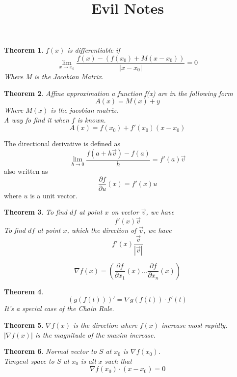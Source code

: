 \documentclass[letter]{article}
\title{Evil Notes}
\date{}
\newtheorem{theorem}{Theorem}[section]
\newenvironment{definition}[1][Definition]{\begin{trivlist}
\item[\hskip \labelsep {\bfseries #1}]}{\end{trivlist}}
\begin{document}
\maketitle
\vspace{-.5in}

\begin{theorem}
$f(x)$ is differentiable if
\[
\lim_{x\to x_0} \frac{f(x) - (f(x_0) + M(x-x_0))}{|x-x_0|} = 0
\]
Where M is the Jocabian Matrix.
\end{theorem}

\begin{theorem}
Affine approximation a function f(x) are in the following form
\[
A(x) = M(x) + y
\]
Where $M(x)$ is the jacobian matrix.\\
A way fo find it when $f$ is known.
\[ A(x) = f(x_0) + f'(x_0)(x-x_0) \]
\end{theorem}

\begin{definition}
The directional derivative is defined as
\[
\lim_{h\to 0} \frac{f(a+h\vec v) - f(a)}{h} = f'(a)\vec v
\]
also written as
\[
\frac{\partial f}{\partial u}(x) = f'(x) u
\]
where $u$ is a unit vector.\\
\end{definition}

\begin{theorem}
To find $df$ at point $x$ on vector $\vec v$, we have
\[
f'(x) \vec v
\]
To find $df$ at point $x$, which the direction of $\vec v$, we have 
\[
f'(x) \frac{\vec v}{|\vec v|}
\]
\end{theorem}
\begin{definition}[The gradient]
\[
\nabla f(x) = (\frac{\partial f}{\partial x_1}(x) \ldots \frac{\partial f}{\partial x_n}(x))
\]
\end{definition}
\begin{theorem}
\[
(g(f(t)))' = \nabla g(f(t)) \cdot f'(t)
\]
It's a special case of the Chain Rule.
\end{theorem}
\begin{theorem}
$\nabla f(x)$ is the direction where $f(x)$ increase most rapidly. $|\nabla f(x)|$ is the magnitude of the maxim increase.
\end{theorem}
\begin{theorem}
Normal vector to $S$ at $x_0$ is $\nabla f(x_0)$.\\
Tangent space to $S$ at $x_0$ is all $x$ such that
\[
\nabla f(x_0) \cdot(x-x_0) = 0
\]
\end{theorem}
\end{document}
